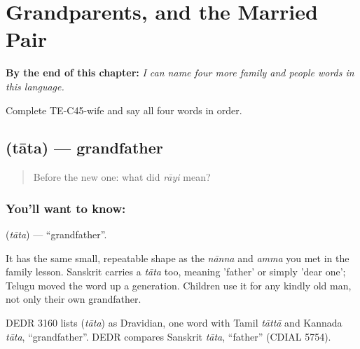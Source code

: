 
\chapter{Grandparents, and the Married Pair}
\label{ch:te-grandparents}

\begin{chapteropening}
\textbf{By the end of this chapter:} \emph{I can name four more family and people words in this language.}

Complete TE-C45-wife and say all four words in order.
\end{chapteropening}

\section[\texorpdfstring{\te{తాత} (tāta)}{తాత (tāta)}]{ (tāta) — grandfather}

\label{lesson:TE-C45-grandfather}



\begin{quote}
Before the new one: what did \emph{rāyi} mean?
\end{quote}

\subsection*{You'll want to know: }
\textbf{} (\emph{tāta}) — \textquotedblleft{}grandfather\textquotedblright{}.

It has the same small, repeatable shape as the \emph{nānna} and \emph{amma} you met in the family lesson. Sanskrit carries a \emph{tāta} too, meaning 'father' or simply 'dear one'; Telugu moved the word up a generation. Children use it for any kindly old man, not only their own grandfather.

\begin{cousinweb}
DEDR 3160 lists \textbf{} (\emph{tāta}) as Dravidian, one word with Tamil \emph{tāttā} and Kannada \emph{tāta}, \textquotedblleft{}grandfather\textquotedblright{}. DEDR compares Sanskrit \emph{tāta}, \textquotedblleft{}father\textquotedblright{} (CDIAL 5754).
\end{cousinweb}

